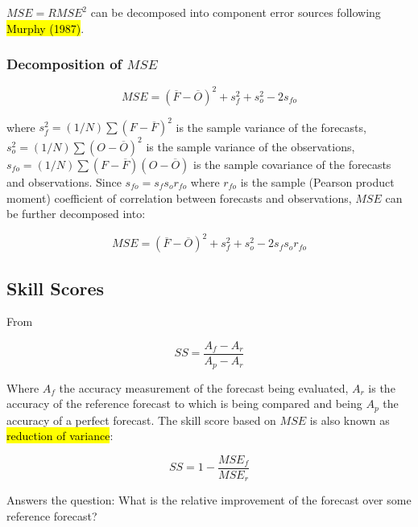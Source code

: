 \documentclass[12pt,a4paper]{article}
\begin{document}
$MSE = RMSE^2$ can be decomposed into component error sources following \hl{Murphy (1987)}. 

\subsubsection{Decomposition of $MSE$}

\cite{Murphy1988}

\begin{equation}
    MSE = (\overline{F} - \overline{O})^2 + s^2_f + s^2_o - 2s_{fo}
\end{equation}

where $s^2_f = (1/N) \sum (F - \overline{F})^2$ is the sample variance of the forecasts, $s^2_o = (1/N) \sum (O - \overline{O})^2$ is the sample variance of the observations,  $s_{fo} = (1/N) \sum (F - \overline{F}) (O - \overline{O})$ is the sample covariance of the forecasts and observations. Since $s_{fo} = s_f s_o r_{fo}$ where $r_{fo}$ is the sample (Pearson product moment) coefficient of correlation between forecasts and observations, $MSE$ can be further decomposed into:

\begin{equation}
    MSE = (\overline{F} - \overline{O})^2 + s^2_f + s^2_o - 2s_f s_o r_{fo}
\end{equation}





\subsection{Skill Scores}

From \cite{Murphy1988}

\begin{equation}
    SS = \frac{A_f - A_r}{A_p - A_r}
\end{equation}

Where $A_f$ the accuracy measurement of the forecast being evaluated, $A_r$ is the accuracy of the reference forecast to which is being compared and being $A_p$ the accuracy of a perfect forecast. The skill score based on $MSE$ is also known as \hl{reduction of variance}:

\begin{equation}
    SS = 1 - \frac{MSE_f}{MSE_r}
\end{equation}


Answers the question: What is the relative improvement of the forecast over some reference forecast?
\end{document}
